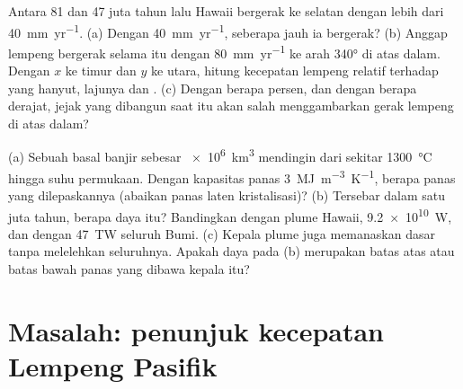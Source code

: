 \begin{exercise}[$\star\star\star$]\label{exo:b1:hotspots:11}
Antara 81 dan 47 juta tahun lalu  Hawaii bergerak ke selatan dengan lebih dari \qty{40}{mm.yr^{-1}}. (a) Dengan \qty{40}{mm.yr^{-1}}, seberapa jauh ia bergerak? (b) Anggap lempeng bergerak selama itu dengan \qty{80}{mm.yr^{-1}} ke arah \ang{340} di atas  dalam. Dengan $x$ ke timur dan $y$ ke utara, hitung kecepatan lempeng relatif terhadap  yang hanyut, lajunya dan . (c) Dengan berapa persen, dan dengan berapa derajat, jejak yang dibangun saat itu akan salah menggambarkan gerak lempeng di atas  dalam?
\end{exercise}

\begin{exercise}[$\star\star\star$]\label{exo:b1:hotspots:12}
(a) Sebuah basal banjir sebesar \qty{e6}{km^3} mendingin dari sekitar \qty{1300}{\celsius} hingga suhu permukaan. Dengan kapasitas panas \qty{3}{MJ.m^{-3}.K^{-1}}, berapa panas yang dilepaskannya (abaikan panas laten kristalisasi)? (b) Tersebar dalam satu juta tahun, berapa daya itu? Bandingkan dengan plume Hawaii, \qty{9.2e10}{W}, dan dengan \qty{47}{TW} seluruh Bumi. (c) Kepala plume juga memanaskan dasar  tanpa melelehkan seluruhnya. Apakah daya pada (b) merupakan batas atas atau batas bawah panas yang dibawa kepala itu?
\end{exercise}

\section{Masalah: penunjuk kecepatan Lempeng Pasifik}

